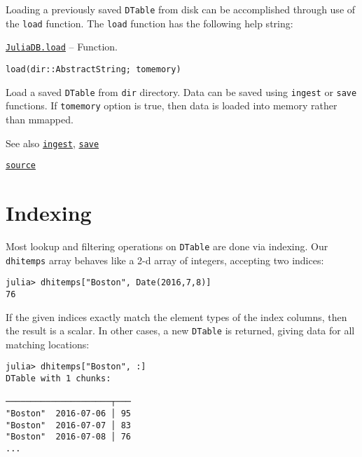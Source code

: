 \documentclass{memoir}
\begin{document}
Loading a previously saved \texttt{DTable} from disk can be accomplished through use of the \texttt{load} function.  The \texttt{load} function has the following help string:


\hypertarget{13696004921527687886}{} 
\hyperlink{13696004921527687886}{\texttt{JuliaDB.load}}  -- {Function.}

\begin{adjustwidth}{2em}{0pt}


\begin{lstlisting}
load(dir::AbstractString; tomemory)
\end{lstlisting}

Load a saved \texttt{DTable} from \texttt{dir} directory. Data can be saved using \texttt{ingest} or \texttt{save} functions. If \texttt{tomemory} option is true, then data is loaded into memory rather than mmapped.

See also \href{tutorial.html\#JuliaDB.ingest}{\texttt{ingest}}, \href{tutorial.html\#JuliaDB.save}{\texttt{save}}



\href{https://github.com/JuliaComputing/JuliaDB.jl/tree/9e65f8c3b0e9c2e27c3334a093a5aefc6c7d1246/src/ingest.jl#L139-L147}{\texttt{source}}


\end{adjustwidth}

\hypertarget{14566118977838625303}{}


\section{Indexing}



Most lookup and filtering operations on \texttt{DTable} are done via indexing. Our \texttt{dhitemps} array behaves like a 2-d array of integers, accepting two indices:




\begin{verbatim}
julia> dhitemps["Boston", Date(2016,7,8)]
76
\end{verbatim}



If the given indices exactly match the element types of the index columns, then the result is a scalar. In other cases, a new \texttt{DTable} is returned, giving data for all matching locations:




\begin{verbatim}
julia> dhitemps["Boston", :]
DTable with 1 chunks:

─────────────────────┬───
"Boston"  2016-07-06 │ 95
"Boston"  2016-07-07 │ 83
"Boston"  2016-07-08 │ 76
...
\end{verbatim}
\end{document}

